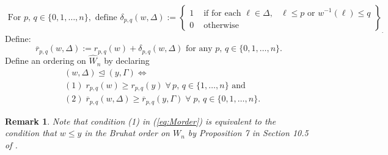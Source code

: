 \documentclass[12pt]{amsart}
\numberwithin{equation}{section}
\newtheorem{rem}[thm]{Remark}
\newcommand{\Wn}{{W}_n}
\newcommand{\cW}{{ W}}
\begin{document}
\begin{equation}\label{eq:littledelta}
\mbox{ For } p,\,q\in\{0,1,\dots, n\}, \mbox{ define } \delta_{p, q} (w,\Delta):=\left\{\begin{array}{ccc} 1 & \mbox { if for each } \ell\in\Delta, & \ell\leq p \mbox{ or } w^{-1}(\ell)\leq q \\
0 &\mbox{ otherwise } & \end{array}\right\}_{.}
\end{equation}
Define:
\begin{equation}\label{eq:secondstat}
\overline{r}_{p,q}(w,\Delta):=r_{p,q}(w)+\delta_{p,q}(w,\Delta)\mbox{ for any } p,\, q\in\{0,1,\dots, n\}.
\end{equation}
Define an ordering on $\widehat{\cW}_{n}$ by declaring 
\begin{equation}\label{eq:Morder}
\begin{split}
&(w,\Delta)\unlhd (y,\Gamma)\Leftrightarrow \\
&(1)\; r_{p,q}(w)\geq r_{p,q}(y) \; \forall\, p,\, q\in\{1,\dots, n\} \mbox{ and } \\
&(2)\; \overline{r}_{p,q}(w,\Delta)\geq \overline{r}_{p,q}(y,\Gamma)\;\forall\; p,\, q\in\{0,1, \dots, n\}.
\end{split}
\end{equation} 

\begin{rem}\label{r:isBruhat}
Note that condition (1) in (\ref{eq:Morder}) is equivalent to the condition
that $w\leq y$ in the Bruhat order on $\Wn$ by Proposition 7 in
Section 10.5 of \cite{Fulton}.  
\end{rem}
\end{document}
